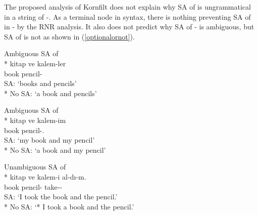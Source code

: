 The proposed analysis of Kornfilt does not explain why SA of {\Poss} is ungrammatical in a string of {\Pl-\Poss}. As a terminal node in syntax, there is nothing preventing SA of {\Poss} in {\Pl-\Poss} by the RNR analysis. It also does not predict why SA of {\Pl-\Poss} is ambiguous, but SA of {\Case} is not as shown in (\ref{optionalornot}).

\begin{exe}
    \ex \label{optionalornot} 
    \begin{xlist}
        \ex Ambiguous SA of {\Pl}\\* 
        \gll kitap ve kalem-ler \\ book {\And} pencil-{\Pl} \\
        \glt SA: `books and pencils' \\*
        No SA: `a book and pencils'
        
        \ex Ambiguous SA of {\Poss}\\* 
        \gll kitap ve kalem-im \\ book {\And} pencil-{\Poss}.{\Fsg} \\
        \glt SA: `my book and my pencil' \\*
        \glt No SA: `a book and my pencil'
        
        \ex Unambiguous SA of {\Acc}\\*
        \gll kitap ve kalem-i al-dı-m. \\ book {\And} pencil-{\Acc} take-{\Pst}-{\Fsg} \\
        \glt SA: `I took the book and the pencil.' \\*
        No SA: `* I took a book and the pencil.'
    \end{xlist}
\end{exe}

